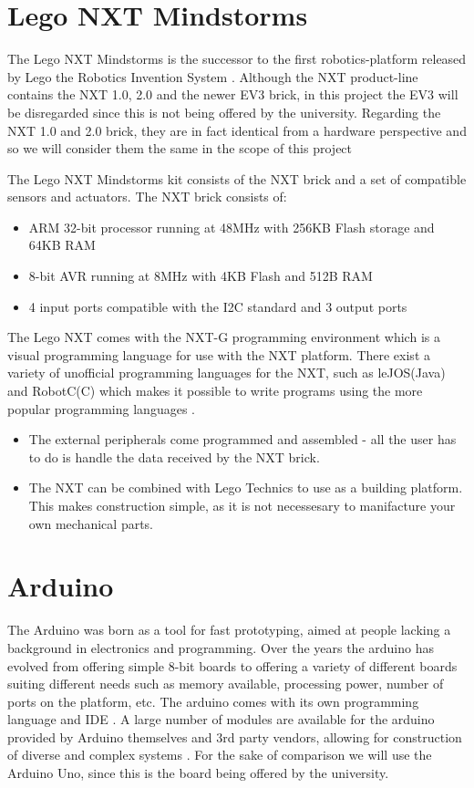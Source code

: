 \section{Lego NXT Mindstorms}
The Lego NXT Mindstorms is the successor to the first robotics-platform released
by Lego the Robotics Invention System \citep{NXTHistory}. Although the NXT
product-line contains the NXT 1.0, 2.0 and the newer EV3 brick, in this project
the EV3 will be disregarded since this is not being offered by the university.
Regarding the NXT 1.0 and 2.0 brick, they are in fact identical from a hardware
perspective and so we will consider them the same in the scope of this project
\citep{NXTversions}\nl

The Lego NXT Mindstorms kit consists of the NXT brick and a set of
compatible sensors and actuators. The NXT brick \citep[P.70]{NXTStats} consists
of:

\begin{itemize}
  \item ARM 32-bit processor running at 48MHz with 256KB Flash storage and 64KB RAM
  \item 8-bit AVR running at 8MHz with 4KB Flash and 512B RAM
  \item 4 input ports compatible with the I2C standard and 3 output ports
\end{itemize}

The Lego NXT comes with the NXT-G programming environment which is a visual
programming language for use with the NXT platform. There exist a variety of
unofficial programming languages for the NXT, such as leJOS(Java) and
RobotC(C) which makes it possible to write programs using the more popular programming
languages \citep{NXTProgrammingLanguage}.

\begin{itemize}
  \item The external peripherals come programmed and assembled - all the user
  has to do is handle the data received by the NXT brick.
  \item The NXT can be combined with Lego Technics to use as a building
  platform. This makes construction simple, as it is not necessesary to
  manifacture your own mechanical parts.
\end{itemize}

\section{Arduino}
The Arduino was born as a tool for fast prototyping, aimed at people lacking a
background in electronics and programming. Over the years the arduino has
evolved from offering simple 8-bit boards to offering a variety of different
boards suiting different needs such as memory available, processing power,
number of ports on the platform, etc. The arduino comes with its
own programming language and IDE \citep{ArduinoIntro}. A large number of modules are available for
the arduino provided by Arduino themselves and 3rd party vendors, allowing for
construction of diverse and complex systems \citep{ArduinoComponents}. For the
sake of comparison we will use the Arduino Uno, since this is the board being
offered by the university.\nl

